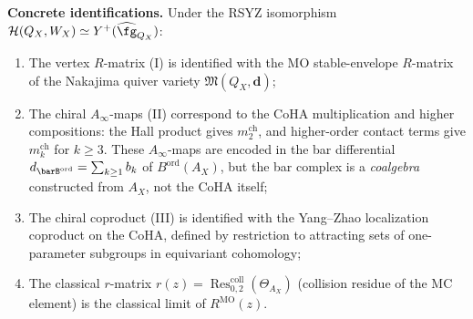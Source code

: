 \begin{theorem}
\medskip\noindent
\textbf{Concrete identifications.}
Under the RSYZ isomorphism $\mathcal{H}(Q_X, W_X) \simeq
Y^+(\widehat{\fg}_{Q_X})$:
\begin{enumerate}[label=\textup{(\roman*)}]
 \item The vertex $R$-matrix \textup{(I)} is identified with the
 MO stable-envelope $R$-matrix of the Nakajima quiver variety
 $\mathfrak{M}(Q_X, \mathbf{d})$;
 \item The chiral $A_\infty$-maps \textup{(II)} correspond to
 the CoHA multiplication and higher compositions: the Hall
 product gives $m_2^{\mathrm{ch}}$, and higher-order contact
 terms give $m_k^{\mathrm{ch}}$ for $k \geq 3$. These
 $A_\infty$-maps are encoded in the bar differential
 $d_{\barB^{\mathrm{ord}}} = \sum_{k \geq 1} b_k$ of
 $B^{\mathrm{ord}}(A_X)$, but the bar complex is a
 \emph{coalgebra} constructed from $A_X$, not the CoHA
 itself;
 \item The chiral coproduct \textup{(III)} is identified with
 the Yang--Zhao localization coproduct on the CoHA,
 defined by restriction to attracting sets of one-parameter
 subgroups in equivariant cohomology;
 \item The classical $r$-matrix
 $r(z) = \operatorname{Res}^{\mathrm{coll}}_{0,2}
 (\Theta_{A_X})$
 \textup{(}collision residue of the MC element\textup{)}
 is the classical limit of $R^{\mathrm{MO}}(z)$.
\end{enumerate}
\end{theorem}


